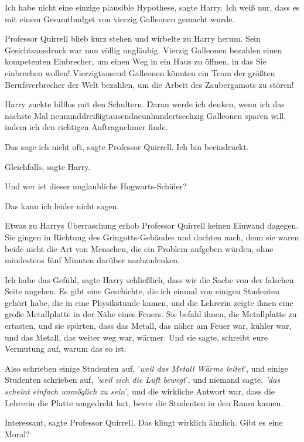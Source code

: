 \glqq{}Ich habe nicht eine einzige plausible Hypothese\grqq{}, sagte Harry. \glqq
Ich weiß nur, dass es mit einem Gesamtbudget von vierzig Galleonen gemacht
wurde.\grqq{}

Professor Quirrell blieb kurz stehen und wirbelte zu Harry herum. Sein
Gesichtsausdruck war nun völlig ungläubig. \glqq{}Vierzig Galleonen bezahlen
einen kompetenten Einbrecher, um einen Weg in ein Haus zu öffnen, in das Sie
einbrechen wollen! Vierzigtausend Galleonen könnten ein Team der größten
Berufsverbrecher der Welt bezahlen, um die Arbeit des Zaubergamots zu
stören!\grqq{}

Harry zuckte hilflos mit den Schultern. \glqq{}Daran werde ich denken, wenn ich
das nächste Mal neununddreißigtausendneunhundertsechzig Galleonen sparen will,
indem ich den richtigen Auftragnehmer finde.\grqq{}

\glqq{}Das sage ich nicht oft\grqq{}, sagte Professor Quirrell. \glqq{}Ich bin
beeindruckt.\grqq{}

\glqq{}Gleichfalls\grqq{}, sagte Harry.

\glqq{}Und wer ist dieser unglaubliche Hogwarts-Schüler?\grqq{}

\glqq{}Das kann ich leider nicht sagen.\grqq{}

Etwas zu Harrys Überraschung erhob Professor Quirrell keinen Einwand dagegen.
Sie gingen in Richtung des Gringotts-Gebäudes und dachten nach, denn sie waren
beide nicht die Art von Menschen, die ein Problem aufgeben würden, ohne
mindestens fünf Minuten darüber nachzudenken.

\glqq{}Ich habe das Gefühl\grqq{}, sagte Harry schließlich, \glqq{}dass wir die
Sache von der falschen Seite angehen. Es gibt eine Geschichte, die ich einmal
von einigen Studenten gehört habe, die in eine Physikstunde kamen, und die
Lehrerin zeigte ihnen eine große Metallplatte in der Nähe eines Feuers. Sie
befahl ihnen, die Metallplatte zu ertasten, und sie spürten, dass das Metall,
das näher am Feuer war, kühler war, und das Metall, das weiter weg war, wärmer.
Und sie sagte, schreibt eure Vermutung auf, warum das so ist.

Also schrieben einige Studenten auf, '\emph{weil das Metall Wärme leitet}', und
einige Studenten schrieben auf, \emph{'weil sich die Luft bewegt}', und niemand
sagte,\emph{ 'das scheint einfach unmöglich zu sein',} und die wirkliche Antwort
war, dass die Lehrerin die Platte umgedreht hat, bevor die Studenten in den Raum
kamen.\grqq{}

\glqq{}Interessant\grqq{}, sagte Professor Quirrell. \glqq{}Das klingt wirklich
ähnlich. Gibt es eine Moral?\grqq{}

